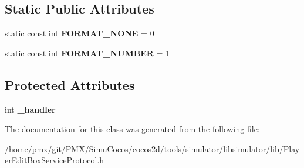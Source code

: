 \subsection*{Static Public Attributes}
\begin{DoxyCompactItemize}
\item 
\mbox{\label{classPlayerEditBoxServiceProtocol_ab0f63bd2ebe2bcc56e57b8a959c35292}} 
static const int {\bfseries F\+O\+R\+M\+A\+T\+\_\+\+N\+O\+NE} = 0
\item 
\mbox{\label{classPlayerEditBoxServiceProtocol_a83b0dd5f34d353e6ba711dfd244251a1}} 
static const int {\bfseries F\+O\+R\+M\+A\+T\+\_\+\+N\+U\+M\+B\+ER} = 1
\end{DoxyCompactItemize}
\subsection*{Protected Attributes}
\begin{DoxyCompactItemize}
\item 
\mbox{\label{classPlayerEditBoxServiceProtocol_a1e20ce1b14e42d823c4f44b165d2203a}} 
int {\bfseries \+\_\+handler}
\end{DoxyCompactItemize}


The documentation for this class was generated from the following file\+:\begin{DoxyCompactItemize}
\item 
/home/pmx/git/\+P\+M\+X/\+Simu\+Cocos/cocos2d/tools/simulator/libsimulator/lib/Player\+Edit\+Box\+Service\+Protocol.\+h\end{DoxyCompactItemize}
